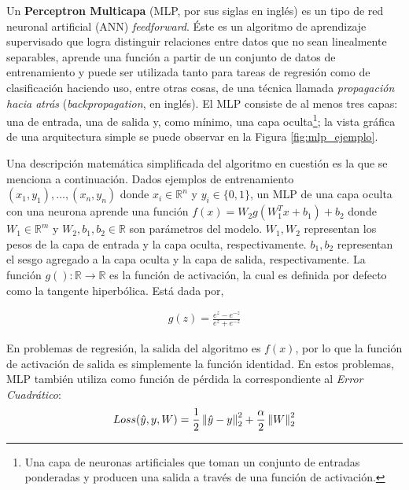     \par Un \textbf{Perceptron Multicapa} (MLP, por sus siglas en inglés)\cite{mlp_intro1, mlp_intro2} es un tipo
      de red neuronal artificial (ANN) \textit{feedforward}.
      Éste es un algoritmo de aprendizaje supervisado que logra distinguir
      relaciones entre datos que no sean linealmente separables, aprende una función
      a partir de un conjunto de datos de entrenamiento y puede ser
      utilizada tanto para tareas de regresión como de clasificación haciendo uso, entre
      otras cosas, de una técnica llamada \textit{propagación hacia atrás}\cite{backpropagation}
      (\textit{backpropagation}, en inglés).
      El MLP consiste de al menos tres capas: una de entrada, una de salida y,
      como mínimo, una capa oculta\footnote{Una capa de neuronas artificiales que toman un conjunto
      de entradas ponderadas y producen una salida a través de una función de activación.};
      la vista gráfica de una arquitectura simple se puede observar en la
      Figura \ref{fig:mlp_ejemplo}.

    \par Una descripción matemática simplificada del algoritmo en cuestión es la
      que se menciona a continuación.
      Dados ejemplos de entrenamiento $(x_{1}, y_{1}), \dots, (x_{n}, y_{n})$
      donde $x_{i} \in \mathbb{R}^{n}$ y $y_{i} \in \{0,1\}$, un MLP de una capa oculta
      con una neurona aprende una función $f(x) = W_{2}g(W_{1}^{T} x + b_{1}) + b_{2}$
      donde $W_{1} \in \mathbb{R}^{m}$ y $W_{2}, b_{1}, b_{2} \in \mathbb{R}$ son
      parámetros del modelo. $W_{1}, W_{2}$ representan los pesos de la capa de entrada y la
      capa oculta, respectivamente. $b_{1}, b_{2}$ representan el sesgo agregado a
      la capa oculta y la capa de salida, respectivamente. La función
      $g(): \mathbb{R} \rightarrow \mathbb{R}$ es la función de activación, la cual
      es definida por defecto como la tangente hiperbólica. Está dada por,

      \begin{align}
        g(z) = \frac{e^{z} - e^{-z}}{e^{z} + e^{-z}}
      \end{align}

      En problemas de regresión, la salida del algoritmo es $f(x)$, por lo que la
      función de activación de salida es simplemente la función identidad. En estos
      problemas, MLP también utiliza como función de pérdida la correspondiente
      al \textit{Error Cuadrático}:
      \begin{align}
        Loss(\hat{y}, y, W) = \frac{1}{2} \left\lVert\hat{y} - y\right\rVert^{2}_{2} + \frac{\alpha}{2} \left\lVert W\right\rVert^{2}_{2}
      \end{align}



